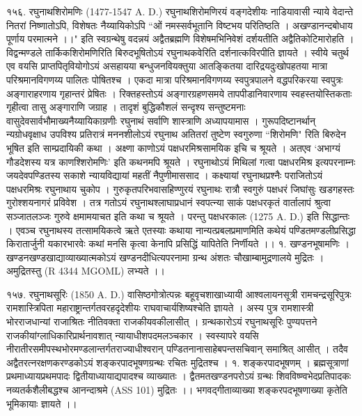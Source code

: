 १५६. रघुनाथशिरोमणिः (1477-1547 A. D.)
रघुनाथशिरोमणिरयं वङ्गदेशीयः नाडियावासी न्याये वेदान्ते नितरां निष्णातोऽपि, विशेषतः नैय्यायिकोऽपि
``ओं नमस्सर्वभूतानि विष्टभय परितिष्ठति ।
अखण्डानन्दबोधाय पूर्णाय परमात्मने ।।"
इति स्वग्रन्थेषु वदन्नयं अद्वैतब्रह्मणि विशेषमभिनिवेशं दर्शयतीति अद्वैतिकोटिमारोहति । विद्वन्मण्डले तार्किकशिरोमणिरिति बिरुदभूषितोऽयं रघुनाथकवेरिति दर्शनात्कविरपीति ज्ञायते । स्वीये चतुर्थ एव वयसि प्राप्तपितृवियोगोऽयं असहायया बन्धुजनवियक्तुया आतङ्कितया दारिद्रयदुःखोपहतया मात्रा परिश्रमानविगणय्य पालितः पोषितश्च । एकदा मात्रा परिश्रमानविगणय्य स्वपुत्रपालने वद्धपरिकरया स्वपुत्रः अङ्गाराहरणाय गृहान्तरं प्रेषितः । रिक्तहस्तोऽयं अङ्गारग्रहणसमये तापपीडानिवारणाय स्वहस्तयोस्तिकताः गृहीत्वा तासु अङ्गाराणि जग्राह । तादृशं बुद्धिकौशलं सन्दृश्य सन्तुष्टमनाः वासुदेवसार्वभौमाख्यनैय्यायिकाग्रणीः रघुनाथं सर्वाणि शास्त्राणि अध्यापयामास । गुरूपदिष्टानर्थान् न्यग्रोधवृक्षाध उपविश्य प्रतिरात्रं मननशीलोऽयं रघुनाथ अतितरां तुष्टेण स्वगुरुणा ``शिरोमणि" रिति बिरुदेन भूषित इति साम्प्रदायिकी कथा ।
अक्ष्णा काणोऽयं पक्षधरमिश्रसामयिक इचि च श्रूयते । अतएव `अभाग्यं गौडदेशस्य यत्र काणश्शिरोमणिः' इति कथनमपि श्रूयते । रघुनाथोऽयं मिथिलां गत्वा पक्षधरमिश्र इत्यपरनाम्नः जयदेवपण्डितस्य सकाशे न्यायविद्यायां महतीं नैपुणीमाससाद । कक्ष्यायां रघुनाथप्रश्नैः पराजितोऽयं पक्षधरमिश्रः रघुनाथाय चुकोप । गुरुकृतपरिभवासहिण्णुरयं रघुनाथः रात्रौ स्वगुरुं पक्षधरं जिघांसुः खडगहस्तः गुरोश्शयनागरं प्रविवेश । तत्र गतोऽयं रघुनाथश्लाघाप्रधानं स्वपत्न्या साकं पक्षधरकृतं वार्तालापं श्रुत्वा सञ्जातलञ्जः गुरुवे क्षमामयाचत इति कथा च श्रूयते ।
परन्तु पक्षधरकालः (1275 A. D.) इति सिद्धान्तः । एवञ्च रघुनाथस्य तत्सामयिकत्वे ऋते एतस्याः कथाया नान्यत्प्रबलप्रमाणमिति कथेयं पण्डितमण्डलीप्रसिद्धा किरातार्जुनी यकारभारवेः कथां मनसि कृत्वा केनापि प्रसिद्धिं यापितेति निर्णीयते ।।
१. खण्डनभूषामणिः ।
खण्डनखण्डखाद्याव्याख्यात्मकोऽयं खण्डनदीधित्यपरनामा ग्रन्थ अंशतः चौखाम्बामुद्रणालये मुद्रितः । अमुद्रितस्तु (R 4344 MGOML) लभ्यते ।।

१५७. रघुनाथसूरिः (1850 A. D.)
वासिष्ठगोत्रोत्पन्नः बहूवृचशाखाध्यायी आश्वलायनसूत्री रामचन्द्रसूरिपुत्रः रामशास्त्रिपिता महाराष्ट्रान्तर्गतवरहदृदेशीयः राघवाचार्यशिष्यश्चेति ज्ञायते । अस्य पुत्र रामशास्त्री भोरराजधान्यां राजाश्रितः नीतिवक्ता राजकीयवकीलासीत् । ग्रन्थकारोऽयं रघुनाथसूरिः पुण्यपत्तने राजकीयांग्लाधिकारिप्रार्थनावशात् न्यायाधीशपदमलञ्चकार । स्वस्यापरे वयसि नीरातीरसमीपस्थभोरमण्डलान्तर्गतराज्याधीश्वरान् पण्डितनानासाहेबपन्तसचिवान् समाश्रित् आसीत् । तदैव अद्वैतरत्नरक्षणकरण्डकोऽयं शङ्करपादभूषणग्रन्थः रचितः मुद्रितश्च ।
१. शङ्करपादभूषणम् । ब्रह्मसूत्राणां प्रथमाध्यायप्रथमपादः द्वितीयाध्यायाद्यपादश्च व्याख्यातः । द्वैतमतखण्डनपरोऽयं ग्रन्थः शिवविष्ण्वभेदप्रतिपादकः नव्यतर्कशैलीबद्धश्च आनन्दाश्रमे (ASS 101) मुद्रितः ।। भगवद्गीताव्याख्या शङ्करपदभूषणाख्या कृतेति भूमिकायाः ज्ञायते ।।

